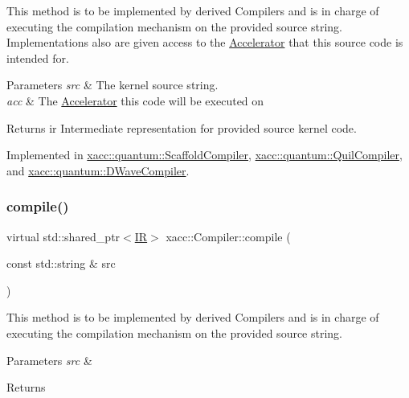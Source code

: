 This method is to be implemented by derived Compilers and is in charge of executing the compilation mechanism on the provided source string. Implementations also are given access to the \hyperlink{a01087}{Accelerator} that this source code is intended for.


\begin{DoxyParams}{Parameters}
{\em src} & The kernel source string. \\
\hline
{\em acc} & The \hyperlink{a01087}{Accelerator} this code will be executed on \\
\hline
\end{DoxyParams}
\begin{DoxyReturn}{Returns}
ir Intermediate representation for provided source kernel code. 
\end{DoxyReturn}


Implemented in \hyperlink{a00935_a7caede75bb2304ba405966651b115543}{xacc\+::quantum\+::\+Scaffold\+Compiler}, \hyperlink{a00911_a2421482415ca4e09963ea4ecddff8100}{xacc\+::quantum\+::\+Quil\+Compiler}, and \hyperlink{a00947_a0f7f6b10b4a881cb27b36eaa6d39e7b1}{xacc\+::quantum\+::\+D\+Wave\+Compiler}.

\mbox{\label{a01103_a9092f5f779b570c91569b59621280c04}} 
\subsubsection{\texorpdfstring{compile()}{compile()}\hspace{0.1cm}{\footnotesize\ttfamily [2/2]}}
{\footnotesize\ttfamily virtual std\+::shared\+\_\+ptr$<$\hyperlink{a01151}{IR}$>$ xacc\+::\+Compiler\+::compile (\begin{DoxyParamCaption}\item[{const std\+::string \&}]{src }\end{DoxyParamCaption})\hspace{0.3cm}{\ttfamily [pure virtual]}}

This method is to be implemented by derived Compilers and is in charge of executing the compilation mechanism on the provided source string. 
\begin{DoxyParams}{Parameters}
{\em src} & \\
\hline
\end{DoxyParams}
\begin{DoxyReturn}{Returns}

\end{DoxyReturn}


